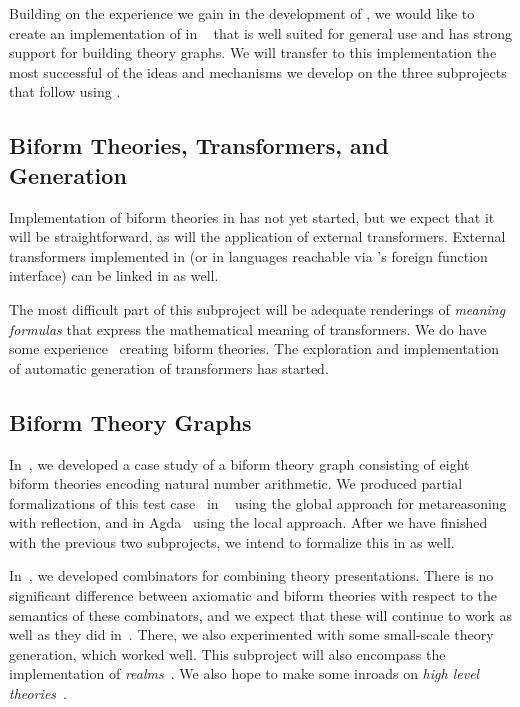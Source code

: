 \documentclass[fleqn]{llncs}
\begin{document}
Building on the experience we gain in the development of {\HLQE}, we
would like to create an implementation of {\churchqe} in
{\MMT}~\cite{RabeKohlhase13} that is well suited for general use and
has strong support for building theory graphs.  We will transfer to
this {\MMT} implementation the most successful of the ideas and
mechanisms we develop on the three subprojects that follow using
{\HLQE}.

\subsection*{Biform Theories, Transformers, and Generation}

Implementation of biform theories in {\HLQE} has not yet started, but
we expect that it will be straightforward, as will the application of
external transformers.  External transformers implemented in {\OCAML}
(or in languages reachable via {\OCAML}'s foreign function interface)
can be linked in as well.

The most difficult part of this subproject will be adequate renderings
of \emph{meaning formulas} that express the mathematical meaning of
transformers. We do have some
experience~\cite{CaretteFarmer17,CaretteFarmerSorge07} creating biform
theories.  The exploration and implementation of automatic generation
of transformers has started.

\subsection*{Biform Theory Graphs}

In~\cite{CaretteFarmer17}, we developed a case study of a biform
theory graph consisting of eight biform theories encoding natural number
arithmetic.  We produced partial formalizations of this test
case~\cite{CaretteFarmer17} in {\churchuqe}~\cite{Farmer17} using the
global approach for metareasoning with reflection, and in
Agda~\cite{Norell07,Norell09} using the local approach.  After we have
finished with the previous two subprojects, we intend to formalize this
in {\HLQE} as well.

In~\cite{CaretteOConnorTPC}, we developed combinators for combining
theory presentations. There is no significant difference between
axiomatic and biform theories with respect to the semantics of
these combinators, and we expect that these will continue to work
as well as they did in~\cite{MathSchemeExper}. There, we also
experimented with some small-scale theory generation, which worked
well. This subproject will also encompass the implementation of
\emph{realms}~\cite{CaretteEtAl14}.  We also hope to make some
inroads on \emph{high level theories}~\cite{CaretteFarmer08}.
\end{document}
